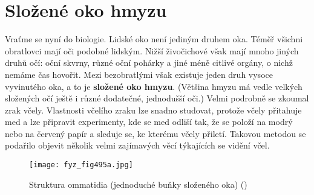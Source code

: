   \section{Složené oko hmyzu}\label{fyz:IchapXXXVIsecIV}
    Vraťme se nyní do biologie. Lidské oko není jediným druhem oka. Téměř všichni obratlovci mají
    oči podobné lidským. Nižší živočichové však mají mnoho jiných druhů očí: oční skvrny, různé oční
    pohárky a jiné méně citlivé orgány, o nichž nemáme čas hovořit. Mezi bezobratlými však existuje
    jeden druh vysoce vyvinutého oka, a to je \textbf{složené oko hmyzu}. (Většina hmyzu má vedle
    velkých složených očí ještě i různé dodatečné, jednodušší oči.) Velmi podrobně se zkoumal zrak
    včely. Vlastnosti včelího zraku lze snadno studovat, protože včely přitahuje med a lze připravit
    experimenty, kde se med odliší tak, že se položí na modrý nebo na červený papír a sleduje se, ke
    kterému včely přiletí. Takovou metodou se podařilo objevit několik velmi zajímavých věcí
    týkajících se vidění včel.

    \begin{figure*}[ht!] %
      \centering
      \texttt{[image: fyz\_fig495a.jpg]}
      \caption{Struktura ommatidia (jednoduché buňky složeného oka) (\cite[s.~697]{Feynman01})}
      \label{fyz:fig495}
    \end{figure*}

